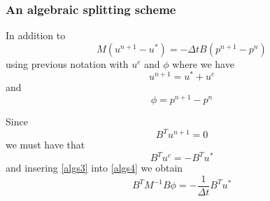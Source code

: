 \begin{frame}
\frametitle{An algebraic splitting scheme}
In addition to 
\begin{equation}
\label{algs3}
M (u^{n+1} - u^*) =  - \Delta t B (p^{n+1} - p^n) 
\end{equation}
using previous notation with $u^c$ and $\phi$ where  
we have 
\[
u^{n+1} = u^* + u^c 
\]
and 
\[
\phi = p^{n+1} - p^n  
\]

Since 
\[
B^T u^{n+1} = 0 
\]
we must have that 
\begin{equation}
\label{algs4}
B^T u^c = - B^T u^* 
\end{equation}
and insering \eqref{algs3} into \eqref{algs4} 
we obtain 
\[
B^T M^{-1} B \phi = - \frac{1}{\Delta t} B^T u^* 
\]

\end{frame}

